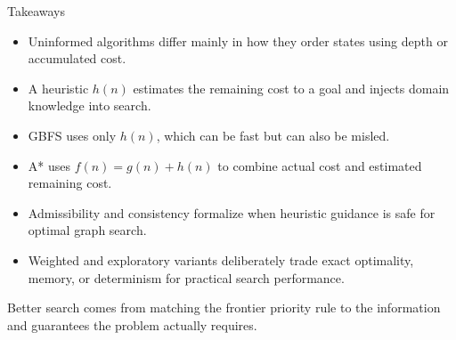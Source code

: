 \documentclass[aspectratio=169,10pt]{beamer}
\begin{document}
\begin{frame}[shrink=20]{Takeaways}
  \begin{itemize}
    \item Uninformed algorithms differ mainly in how they order states using depth or accumulated cost.
    \item A heuristic $h(n)$ estimates the remaining cost to a goal and injects domain knowledge into search.
    \item GBFS uses only $h(n)$, which can be fast but can also be misled.
    \item A* uses $f(n)=g(n)+h(n)$ to combine actual cost and estimated remaining cost.
    \item Admissibility and consistency formalize when heuristic guidance is safe for optimal graph search.
    \item Weighted and exploratory variants deliberately trade exact optimality, memory, or determinism for practical search performance.
  \end{itemize}

  \begin{keyidea}
    Better search comes from matching the frontier priority rule to the information and guarantees the problem actually requires.
  \end{keyidea}
\end{frame}
\end{document}
